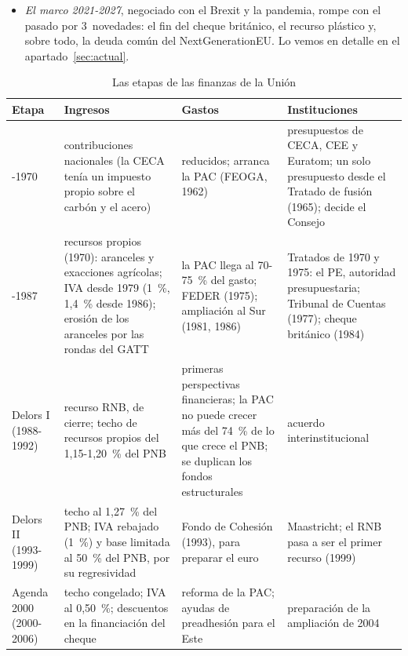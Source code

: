 \documentclass[11pt]{article}
\begin{document}
\begin{itemize}
\begin{itemize}
  \item \emph{instituciones}: con el Tratado de Lisboa (2009), el marco pasó a ser un reglamento (art. 312~TFUE) y desapareció la distinción entre gastos obligatorios y no obligatorios: el Parlamento decide ya sobre todo el presupuesto anual en igualdad con el Consejo.
  \end{itemize}
\item \emph{El marco 2021-2027}, negociado con el Brexit y la pandemia, rompe con el pasado por 3~novedades: el fin del cheque británico, el recurso plástico y, sobre todo, la deuda común del NextGenerationEU. Lo vemos en detalle en el apartado~\ref{sec:actual}.
\end{itemize}

\begin{table}[H]
\centering
\caption{Las etapas de las finanzas de la Unión}\label{tab:historia}
\small
\begin{tabular}{>{\raggedright\arraybackslash}m{2.4cm}>{\raggedright\arraybackslash}m{4.4cm}>{\raggedright\arraybackslash}m{4.4cm}>{\raggedright\arraybackslash}m{3.9cm}}
\hline
\textbf{Etapa} & \textbf{Ingresos} & \textbf{Gastos} & \textbf{Instituciones}\\
\hline
1951-1970 & contribuciones nacionales (la CECA tenía un impuesto propio sobre el carbón y el acero) & reducidos; arranca la PAC (FEOGA, 1962) & presupuestos de CECA, CEE y Euratom; un solo presupuesto desde el Tratado de fusión (1965); decide el Consejo\\
1970-1987 & recursos propios (1970): aranceles y exacciones agrícolas; IVA desde 1979 (1~\%, 1,4~\% desde 1986); erosión de los aranceles por las rondas del GATT & la PAC llega al 70-75~\% del gasto; FEDER (1975); ampliación al Sur (1981, 1986) & Tratados de 1970 y 1975: el PE, autoridad presupuestaria; Tribunal de Cuentas (1977); cheque británico (1984)\\
Delors I (1988-1992) & recurso RNB, de cierre; techo de recursos propios del 1,15-1,20~\% del PNB & primeras perspectivas financieras; la PAC no puede crecer más del 74~\% de lo que crece el PNB; se duplican los fondos estructurales & acuerdo interinstitucional\\
Delors II (1993-1999) & techo al 1,27~\% del PNB; IVA rebajado (1~\%) y base limitada al 50~\% del PNB, por su regresividad & Fondo de Cohesión (1993), para preparar el euro & Maastricht; el RNB pasa a ser el primer recurso (1999)\\
Agenda 2000 (2000-2006) & techo congelado; IVA al 0,50~\%; descuentos en la financiación del cheque & reforma de la PAC; ayudas de preadhesión para el Este & preparación de la ampliación de 2004\\

\end{tabular}
\end{table}
\end{document}
